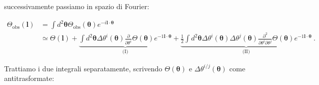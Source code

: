 \documentclass[a4paper,10pt]{article}
\newcommand{\B}{\boldsymbol}
\begin{document}
successivamente passiamo in spazio di Fourier:

\begin{equation} \label{eq:sviluppoanisotrfourier}
\begin{aligned}
    \Theta_{\mathrm{obs}}(\B l) &= \int d^2 \B \theta \Theta_{\mathrm{obs}}(\B\theta) e^{-i \B l \cdot \B \theta}  \\
                                &\simeq \Theta(\B l) + \underbrace{\int d^2 \B \theta \Delta \theta^i (\B\theta) \frac{\partial}{\partial \theta^i} \Theta(\B\theta) e^{-1 \B l \cdot \B \theta}}_\text{(I)} + \underbrace{\frac{1}{2} \int d^2 \B \theta \Delta \theta^i (\B\theta) \Delta \theta^j (\B\theta) \frac{\partial^2}{\partial \theta^i \partial \theta^j} \Theta(\B\theta) e^{-1 \B l \cdot \B \theta}}_{\text{(II)}} \ .
\end{aligned}
\end{equation}

Trattiamo i due integrali separatamente, scrivendo $\Theta(\B \theta)$ e $\Delta \theta^{i/j}(\B \theta)$ come antitrasformate:
\end{document}
